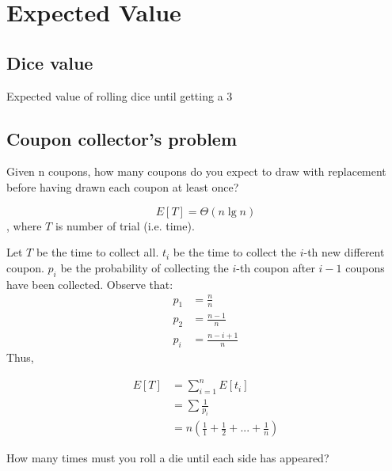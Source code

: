 \section{Expected Value}
\subsection{Dice value}
Expected value of rolling dice until getting a 3
\subsection{Coupon collector's problem}
Given n coupons, how many coupons do you expect to draw with replacement before having drawn each coupon at least once?

$$
E[T] = \Theta(n \lg n)
$$
, where $T$ is number of trial (i.e. time).

Let $T$ be the time to collect all. $t_i$ be the time to collect the $i$-th new different coupon. $p_i$ be the probability of collecting the $i$-th coupon after $i-1$ coupons have been collected. Observe that:
\begin{align*}
p_1 &= \frac{n}{n} \\ 
p_2 &= \frac{n-1}{n} \\
p_i &= \frac{n-i+1}{n}
\end{align*}
Thus,

\begin{align*}
E[T] &= \sum_{i=1}^n E[t_i] \\
&= \sum \frac{1}{p_i} \\
&= n(\frac{1}{1}+\frac{1}{2}+...+\frac{1}{n})
\end{align*}

 How many times must you roll a die until each side has appeared?
